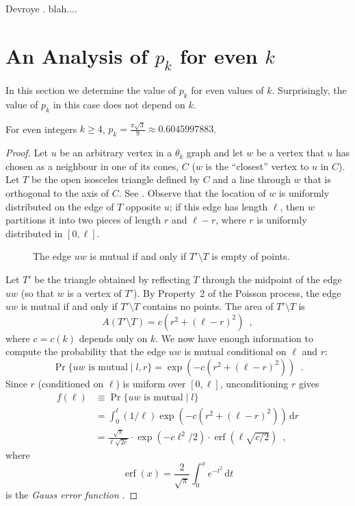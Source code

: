 \documentclass{patmorin}
\DeclareMathOperator{\erf}{erf}
\begin{document}
Devroye \etal. blah.... 



\section{An Analysis of $p_k$ for even $k$}

In this section we determine the value of $p_k$ for even values of $k$.
Surprisingly, the value of $p_k$ in this case does not depend on $k$.

\begin{lem}
 For even integers $k\ge 4$, $p_k=\frac{\pi\sqrt{3}}{9}\approx 0.6045997883$.
\end{lem}

\begin{proof}
  Let $u$ be an arbitrary vertex in a $\theta_k$ graph and let $w$
  be a vertex that $u$ has chosen as a neighbour in one of its cones,
  $C$ ($w$ is the ``closest'' vertex to $u$ in $C$).  Let $T$ be the
  open isosceles triangle defined by $C$ and a line
  through $w$ that is orthogonal to the axis of $C$. See .
  Observe that the location of $w$ is uniformly distributed on the
  edge of $T$ opposite $u$;  if this edge has length $\ell$, then $w$
  partitions it into two pieces of length $r$ and $\ell-r$, where $r$
  is uniformly distributed in $[0,\ell]$.

  \begin{figure}
    \caption{The edge $uw$ is mutual if and only if $T'\setminus T$ 
       is empty of points.}
  \end{figure}
 
  Let $T'$ be the triangle obtained by reflecting $T$ through the midpoint
  of the edge $uw$ (so that $w$ is a vertex of $T'$). By Property~2 of the
  Poisson process, the edge $uw$ is mutual if and only if $T'\setminus T$
  contains no points.  The area of $T'\setminus T$ is
  \[
     A(T'\setminus T) = c(r^2+(\ell-r)^2)  \enspace ,
  \]
  where $c=c(k)$ depends only on $k$.  We now have enough information
  to compute the probability that the edge $uw$ is mutual conditional
  on $\ell$ and $r$:
  \[
    \Pr\{\mbox{$uw$ is mutual} \mid l,r\} = \exp(-c(r^2+(\ell-r)^2))
      \enspace .
  \]
  Since $r$ (conditioned on $\ell$) is uniform over $[0,\ell]$, unconditioning
  $r$ gives
  \begin{align*}
    f(\ell) & \equiv \Pr\{\mbox{$uw$ is mutual} \mid l\} \\
     & = \int_0^\ell (1/\ell)\exp(-c(r^2+(\ell-r)^2))\,\mathrm{d}r \\
     & = \frac{\sqrt{\pi}}{\ell\sqrt{2c}}
            \cdot\exp(-c\ell^2/2)
            \cdot\erf(\ell\sqrt{c/2})  \enspace ,
  \end{align*}
  where 
  \[ \erf(x)=\frac{2}{\sqrt{\pi}}\int_0^x e^{-t^2}\,\mathrm{d}t \]
  is the \emph{Gauss error function} \cite{gauss-error}.  


\end{proof}
\end{document}
